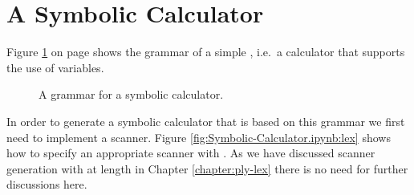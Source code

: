 \section{A Symbolic Calculator}
Figure \ref{fig:calculator.g} on page \pageref{fig:calculator.g} shows the grammar of a simple 
, i.e.~a calculator that supports the use of variables.  

\begin{figure}[!ht]

  \begin{center}    
  \end{center}
  \caption{A grammar for a symbolic calculator.}
  \label{fig:calculator.g}
\end{figure}

In order to generate a symbolic calculator that is based on this grammar we first need to implement a scanner.
Figure \ref{fig:Symbolic-Calculator.ipynb:lex} shows how to specify an appropriate scanner with .
As we have discussed scanner generation with  at length in Chapter \ref{chapter:ply-lex} there is
no need for further discussions here.


